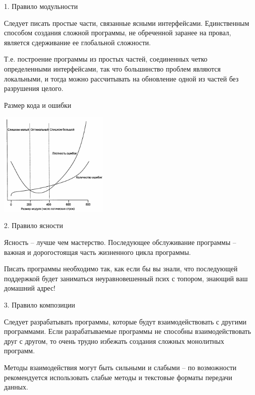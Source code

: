 \begin{frame}{1. Правило модульности}
	\begin{block}{Следует писать простые части,  связанные ясными интерфейсами.}
		\pause
Единственным способом создания сложной программы,  не обреченной заранее на провал,  является сдерживание ее глобальной сложности.
	\end{block}
	\pause
Т.е. построение программы из простых частей, соединенных четко определенными интерфейсами, 
так что большинство проблем являются локальными, 
и тогда можно рассчитывать на обновление одной из частей без разрушения целого.
\end{frame}

\begin{frame}{Размер кода и ошибки}
	\begin{center}
		\includegraphics[width=200px]{02-errors_density-graph.png}
	\end{center}
\end{frame}

\begin{frame}{2. Правило ясности}
	\begin{block}{Ясность -- лучше чем мастерство.}
		\pause
		Последующее обслуживание программы -- важная и дорогостоящая часть жизненного цикла программы.
	\end{block}
	\pause
Писать программы необходимо так,  как если бы вы знали,  что последующей поддержкой будет заниматься неуравновешенный псих с топором,  знающий ваш домашний адрес!
\end{frame}

\begin{frame}{3. Правило композиции}
	\begin{block}{Следует разрабатывать программы,  которые будут взаимодействовать с другими программами.}
		\pause
		Если разрабатываемые программы не способны взаимодействовать друг с другом,  то очень трудно избежать создания сложных монолитных  программ.
	\end{block}
	\pause
	Методы взаимодействия могут быть сильными и слабыми -- по возможности рекомендуется использовать слабые методы и текстовые форматы передачи данных.
\end{frame}

